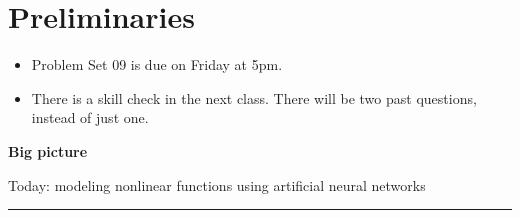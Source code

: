 \documentclass[12pt,letterpaper,noanswers]{exam}
\begin{document}
 \pdfpageheight 11in 
  \pdfpagewidth 8.5in

\noindent 

\section*{Preliminaries}


\begin{itemize}
\itemsep0pt
\item Problem Set 09 is due on Friday at 5pm.
\item There is a skill check in the next class.  There will be two past questions, instead of just one.
\end{itemize}


\noindent\textbf{Big picture}

Today: modeling nonlinear functions using artificial neural networks

\vspace{0.2cm}
\hrule
\vspace{0.2cm}
\end{document}
